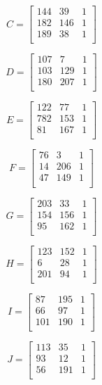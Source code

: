 \documentclass[12pft, english]{article}
\begin{document}
\begin{multicols}{2}
  \[
    C =
    \begin{bmatrix}
      144 & 39  & 1 \\
      182 & 146 & 1 \\
      189 & 38  & 1\\
    \end{bmatrix}
  \]

  \[
    D =
    \begin{bmatrix}
      107 & 7   & 1 \\
      103 & 129 & 1 \\
      180 & 207 & 1\\
    \end{bmatrix}
  \]

  \[
    E =
    \begin{bmatrix}
      122 & 77  & 1 \\
      782 & 153 & 1 \\
      81  & 167 & 1\\
    \end{bmatrix}
  \]

  \[
    F =
    \begin{bmatrix}
      76  & 3   & 1 \\
      14  & 206 & 1 \\
      47  & 149 & 1\\
    \end{bmatrix}
  \]

  \[
    G =
    \begin{bmatrix}
      203 & 33  & 1 \\
      154 & 156 & 1 \\
      95  & 162 & 1\\
    \end{bmatrix}
  \]

  \[
    H =
    \begin{bmatrix}
      123 & 152 & 1 \\
      6   & 28  & 1 \\
      201 & 94  & 1\\
    \end{bmatrix}
  \]

  \[
    I =
    \begin{bmatrix}
      87  & 195 & 1 \\
      66  & 97  & 1 \\
      101 & 190 & 1\\
    \end{bmatrix}
  \]

  \[
    J =
    \begin{bmatrix}
      113 & 35  & 1 \\
      93  & 12  & 1 \\
      56  & 191 & 1\\
    \end{bmatrix}
  \]


\end{multicols}
\end{document}
